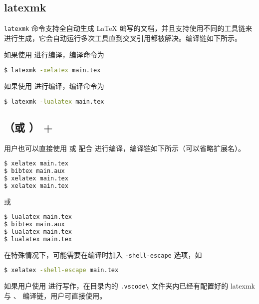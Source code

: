 \subsection{latexmk}
\verb|latexmk| 命令支持全自动生成 \LaTeX{} 编写的文档，并且支持使用不同的工具链来进行生成，它会自动运行多次工具直到交叉引用都被解决。编译链如下所示。

如果使用  进行编译，编译命令为
\lstset{basicstyle=\ttfamily, breaklines=true}
\begin{lstlisting}[language=bash]
$ latexmk -xelatex main.tex
\end{lstlisting}

如果使用  进行编译，编译命令为
\lstset{basicstyle=\ttfamily, breaklines=true}
\begin{lstlisting}[language=bash]
$ latexmk -lualatex main.tex
\end{lstlisting}

\subsection{（或 ） + }
用户也可以直接使用  或  配合  进行编译，编译链如下所示（可以省略扩展名）。
\begin{lstlisting}[language=bash]
$ xelatex main.tex  
$ bibtex main.aux
$ xelatex main.tex
$ xelatex main.tex
\end{lstlisting}
或
\begin{lstlisting}[language=bash]
$ lualatex main.tex  
$ bibtex main.aux
$ lualatex main.tex
$ lualatex main.tex
\end{lstlisting}

在特殊情况下，可能需要在编译时加入 \verb|-shell-escape| 选项，如
\begin{lstlisting}[language=bash]
$ xelatex -shell-escape main.tex 
\end{lstlisting}

如果用户使用  进行写作，在目录内的 \verb|.vscode\| 文件夹内已经有配置好的 latexmk 与 、 编译链，用户可直接使用。